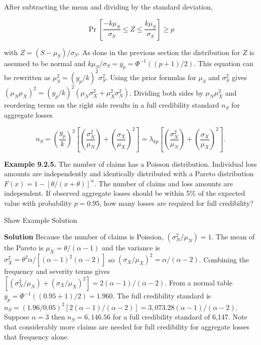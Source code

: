 \documentclass[]{book}
\theoremstyle{definition}
\theoremstyle{definition}
\theoremstyle{definition}
\theoremstyle{remark}
\begin{document}
\noindent After subtracting the mean and dividing by the standard
deviation,

\begin{equation*}
\Pr\left[\frac{-k\mu_S}{\sigma_S}\leq Z \leq \frac{k\mu_S}{\sigma_S}\right] \geq p
\end{equation*}

with \(Z = (S-\mu_S)/\sigma_S\). As done in the previous section the
distribution for \(Z\) is assumed to be normal and
\(k\mu_S/\sigma_S=y_p=\Phi^{-1}((p+1)/2)\). This equation can be
rewritten as \(\mu_S^2=(y_p/k)^2\sigma_S^2\). Using the prior formulas
for \(\mu_S\) and \(\sigma_{S}^2\) gives
\((\mu_N\mu_X)^2=(y_p/k)^2(\mu_N\sigma^{2}_X+\mu^{2}_X\sigma^{2}_N)\).
Dividing both sides by \(\mu_N\mu_X^2\) and reordering terms on the
right side results in a full credibility standard \(n_S\) for aggregate
losses

\begin{equation}
n_S=\left(\frac{y_p}{k}\right)^2\left[\left(\frac{\sigma_N^2}{\mu_N}\right)+\left(\frac{\sigma_X}{\mu_X}\right)^2\right]=\lambda_{kp}\left[\left(\frac{\sigma_N^2}{\mu_N}\right)+\left(\frac{\sigma_X}{\mu_X}\right)^2\right].
\label{eq:full-credibility-losses}
\end{equation}

\textbf{Example 9.2.5.} The number of claims has a Poisson distribution.
Individual loss amounts are independently and identically distributed
with a Pareto distribution \(F(x)=1-[\theta/(x+\theta)]^{\alpha}\). The
number of claims and loss amounts are independent. If observed aggregate
losses should be within 5\(\%\) of the expected value with probability
\(p=0.95\), how many losses are required for full credibility?

Show Example Solution

\hypertarget{toggleExampleCred.2.5}{}
\textbf{Solution} Because the number of claims is Poission,
\((\sigma_N^2/\mu_N)=1\). The mean of the Pareto is
\(\mu_X=\theta/(\alpha-1)\) and the variance is
\(\sigma_X^2=\theta^{2}\alpha/[(\alpha-1)^{2}(\alpha-2)]\) so
\((\sigma_X/\mu_X)^2=\alpha/(\alpha-2)\). Combining the frequency and
severity terms gives
\([(\sigma_N^2/\mu_N)+(\sigma_X/\mu_X)^2]=2(\alpha-1)/(\alpha-2)\). From
a normal table \(y_p=\Phi^{-1}((0.95+1)/2)=1.960\). The full credibility
standard is
\(n_S=(1.96/0.05)^{2}[2(\alpha-1)/(\alpha-2)]=3,073.28(\alpha-1)/(\alpha-2)\).
Suppose \(\alpha=3\) then \(n_S=6,146.56\) for a full credibility
standard of 6,147. Note that considerably more claims are needed for
full credibility for aggregate losses that frequency alone.
\end{document}

